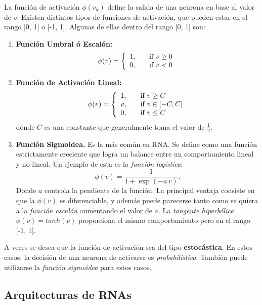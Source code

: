 \documentclass[10pt,a4paper]{article}
\begin{document}
La función de activación $\phi(v_k)$ define la salida de una neurona en base al valor de $v$. Existen distintos tipos de funciones de activación, que pueden estar en el rango [0, 1] o [-1, 1]. Algunas de ellas dentro del rango [0, 1] son:

\begin{multicols}{2}
\begin{enumerate}
\item \textbf{Función Umbral ó Escalón:}
\[
\phi(v) = 
 \left\{ 
  \begin{array}{l l}
    1, & \quad \text{if $v \geq 0$}\\
    0, & \quad \text{if $v < 0$}
  \end{array} 
 \right.
\]
%
\item \textbf{Función de Activación Lineal:}
\[
\phi(v) = 
 \left\{ 
  \begin{array}{l l}
    1, & \quad \text{if $v \geq C$}\\
    v, & \quad \text{if $v \in [-C, C]$} \\
    0, & \quad \text{if $v \leq C$}
  \end{array} 
 \right.
\]
dónde $C$ es una constante que generalmente toma el valor de $\frac{1}{2}$.
%
\item \textbf{Función Sigmoidea.} Es la más común en RNA. Se define como una función estríctamente creciente que logra un balance entre un comportamiento lineal y no-lineal. Un ejemplo de esta es la \textit{función logística}:
\[\phi(v) = \frac{1}{1+\exp(-a\,v)}.\]
Donde $a$ controla la pendiente de la función. La principal ventaja consiste en que la $\phi(v)$ es diferenciable, y además puede parecerse tanto como se quiera a la \textit{función escalón} aumentando el valor de $a$. La \textit{tangente hiperbólica} $\phi(v)=tanh(v)$ proporciona el mismo comportamiento pero en el rango [-1, 1].
\end{enumerate}
\end{multicols}

A veces se desea que la función de activación sea del tipo \textbf{estocástica}. En estos casos, la decisión de una neurona de activarse es \textit{probabilística}. También puede utilizarse la \textit{función sigmoidea} para estos casos.

\subsection{Arquitecturas de RNAs}
\end{document}
